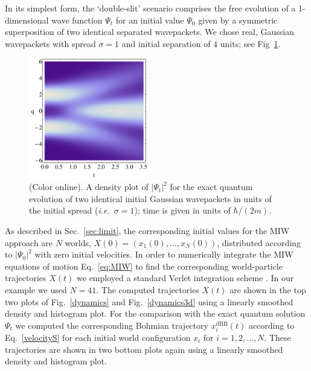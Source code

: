 \documentclass[twocolumn,aps,pra,amsmath,amssymb,superscriptaddress]{revtex4}
\newcommand{\ie}{{\em i.e.}}
\renewcommand{\(}{\left(}
\renewcommand{\)}{\right)}
\newcommand{\blk}{\color{black}}
\begin{document}
In its simplest form, the `double-slit' scenario comprises the free 
evolution of a 1-dimensional \blk wave function $\Psi_t$ for an initial value $\Psi_0$ given by a
symmetric  superposition of two identical separated wavepackets.  
We chose  \blk real, Gaussian wavepackets with spread $\sigma=1$
and initial separation of $4$ units; see Fig~\ref{qm}. 
\begin{figure}[!t]
	\centering
	\includegraphics[width=0.47\textwidth]{qm_density.jpg}
    \caption{\label{qm} (Color online).
    A density plot of $|\Psi_t|^2$ 
    for the exact quantum evolution of two identical initial Gaussian
    wavepackets in units of the initial spread (\ie~$\sigma=1$); \blk time is given in units
of $\hbar/(2m)$.\blk}
\end{figure}
As described in Sec.~\ref{sec:limit}, the corresponding initial values for
the MIW approach are $N$ worlds,
${X}(0)=({x}_1(0),\ldots,{x}_N(0))$, distributed according
to $|\Psi_0|^2$ with zero initial velocities.
In order to numerically integrate the MIW equations of motion Eq.~\ref{eq:MIW}
to find the corresponding world-particle trajectories ${X}(t)$ we employed
 a standard Verlet integration scheme  \cite{verlet}. 
In our example we used $N=41$. The computed trajectories ${X(t)}$
are shown in the top two plots of Fig.~\ref{dynamics}  and
Fig.~\ref{dynamics3d}  using a linearly smoothed
density and histogram plot.  For the comparison with the exact quantum solution $\Psi_t$
we computed the corresponding Bohmian trajectory $x^{\mathrm{dBB}}_i(t)$
according to Eq.~\ref{velocityS} for each initial world configuration $x_i$ for
$i=1,2,\ldots,N$.  These trajectories are shown in two bottom plots again using
a linearly smoothed density and histogram plot.  
\end{document}
